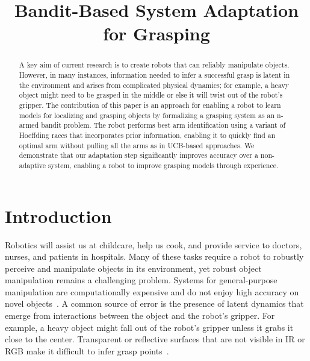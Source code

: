 \documentclass{article}
\title{Bandit-Based System Adaptation for Grasping}
\author{}
\begin{document}
\maketitle

\begin{abstract}
A key aim of current research is to create robots that can reliably
manipulate objects.  However, in many instances, information needed to
infer a successful grasp is latent in the environment and arises from
complicated physical dynamics; for example, a heavy object might need
to be grasped in the middle or else it will twist out of the robot's gripper.  
The contribution of this paper is an
approach for enabling a robot to learn models for 
localizing and grasping objects by formalizing a grasping system as an
n-armed bandit problem.  The robot performs best arm identification
using a variant of Hoeffding races that incorporates prior
information, enabling it to quickly find an optimal arm without
pulling all the arms as in UCB-based approaches.  We demonstrate that
our adaptation step significantly improves accuracy over a
non-adaptive system, enabling a robot to improve grasping
models through experience.





\end{abstract}



\section{Introduction}
Robotics will assist us at childcare, help us cook, and provide
service to doctors, nurses, and patients in hospitals. Many of these
tasks require a robot to robustly perceive and manipulate objects in
its environment, yet robust object manipulation remains a challenging
problem.  Systems for general-purpose manipulation are computationally
expensive and do not enjoy high accuracy on novel
objects~\citep{saxena08}.  A common source of error is the presence of
latent dynamics that emerge from interactions between the object and
the robot's gripper.  For example, a heavy object might fall out of
the robot's gripper unless it grabs it close to the center.
Transparent or reflective surfaces that are not visible in IR or RGB
make it difficult to infer grasp points~\citep{x}.
\end{document}
